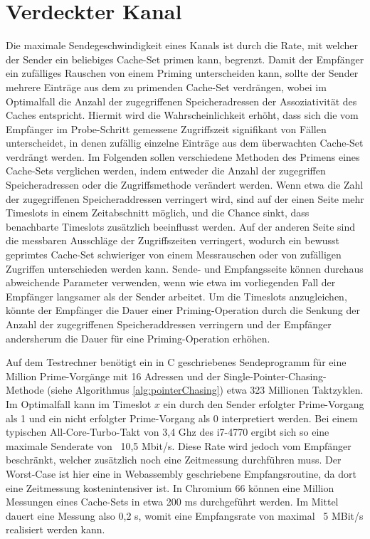 \section{Verdeckter Kanal}

Die maximale Sendegeschwindigkeit eines Kanals ist durch die Rate, mit welcher der Sender ein beliebiges Cache-Set primen kann, begrenzt.
Damit der Empfänger ein zufälliges Rauschen von einem Priming unterscheiden kann, sollte der Sender mehrere Einträge aus dem zu primenden Cache-Set verdrängen, wobei im Optimalfall die Anzahl der zugegriffenen Speicheradressen der Assoziativität des Caches entspricht.
Hiermit wird die Wahrscheinlichkeit erhöht, dass sich die vom Empfänger im Probe-Schritt gemessene Zugriffszeit signifikant von Fällen unterscheidet, in denen zufällig einzelne Einträge aus dem überwachten Cache-Set verdrängt werden. 
Im Folgenden sollen verschiedene Methoden des Primens eines Cache-Sets verglichen werden, indem entweder die Anzahl der zugegriffen Speicheradressen oder die Zugriffsmethode verändert werden.
Wenn etwa die Zahl der zugegriffenen Speicheraddressen verringert wird, sind auf der einen Seite mehr Timeslots in einem Zeitabschnitt möglich, und die Chance sinkt, dass benachbarte Timeslots zusätzlich beeinflusst werden. Auf der anderen Seite sind die messbaren Ausschläge der Zugriffszeiten verringert, wodurch ein bewusst geprimtes Cache-Set schwieriger von einem Messrauschen oder von zufälligen Zugriffen unterschieden werden kann.
Sende- und Empfangsseite können durchaus abweichende Parameter verwenden, wenn wie etwa im vorliegenden Fall der Empfänger langsamer als der Sender arbeitet. Um die Timeslots anzugleichen, könnte der Empfänger die Dauer einer Priming-Operation durch die Senkung der Anzahl der zugegriffenen Speicheraddressen verringern und der Empfänger andersherum die Dauer für eine Priming-Operation erhöhen. 

Auf dem Testrechner benötigt ein in C geschriebenes Sendeprogramm für eine Million Prime-Vorgänge mit 16 Adressen und der Single-Pointer-Chasing-Methode (siehe Algorithmus \ref{alg:pointerChasing}) etwa 323 Millionen Taktzyklen.
Im Optimalfall kann im Timeslot $x$ ein durch den Sender erfolgter Prime-Vorgang als 1 und ein nicht erfolgter Prime-Vorgang  als 0 interpretiert werden.
Bei einem typischen All-Core-Turbo-Takt von 3,4 Ghz des i7-4770 ergibt sich so eine maximale Senderate von ~10,5 Mbit/s.
Diese Rate wird jedoch vom Empfänger beschränkt, welcher zusätzlich noch eine Zeitmessung durchführen muss. Der Worst-Case ist hier eine in Webassembly geschriebene Empfangsroutine, da dort eine Zeitmessung kostenintensiver ist. In Chromium 66 können eine Million Messungen eines Cache-Sets in etwa 200 ms durchgeführt werden.
Im Mittel dauert eine Messung also 0,2 \textmu s, womit eine Empfangsrate von maximal ~5 MBit/s realisiert werden kann.

